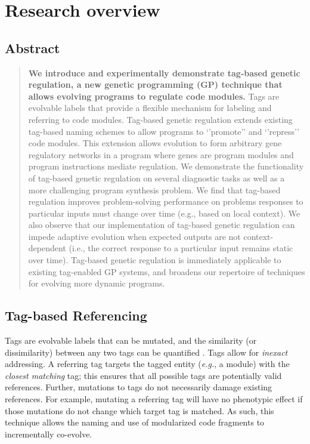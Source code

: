 \documentclass[]{book}
\begin{document}
\hypertarget{research-overview}{%
\section{Research overview}\label{research-overview}}

\hypertarget{abstract}{%
\subsection{Abstract}\label{abstract}}

\begin{quote}
\textbf{We introduce and experimentally demonstrate tag-based genetic regulation, a new genetic programming (GP) technique that allows evolving programs to regulate code modules.}
Tags are evolvable labels that provide a flexible mechanism for labeling and referring to code modules.
Tag-based genetic regulation extends existing tag-based naming schemes to allow programs to `'promote'' and `'repress'' code modules.
This extension allows evolution to form arbitrary gene regulatory networks in a program where genes are program modules and program instructions mediate regulation.
We demonstrate the functionality of tag-based genetic regulation on several diagnostic tasks as well as a more challenging program synthesis problem.
We find that tag-based regulation improves problem-solving performance on problems responses to particular inputs must change over time (e.g., based on local context).
We also observe that our implementation of tag-based genetic regulation can impede adaptive evolution when expected outputs are not context-dependent (i.e., the correct response to a particular input remains static over time).
Tag-based genetic regulation is immediately applicable to existing tag-enabled GP systems, and broadens our repertoire of techniques for evolving more dynamic programs.
\end{quote}

\hypertarget{tag-based-referencing}{%
\subsection{Tag-based Referencing}\label{tag-based-referencing}}

Tags are evolvable labels that can be mutated, and the similarity (or dissimilarity) between any two tags can be quantified \citep{spector_tag-based_2011}.
Tags allow for \emph{inexact} addressing.
A referring tag targets the tagged entity (\emph{e.g.}, a module) with the \emph{closest matching} tag;
this ensures that all possible tags are potentially valid references.
Further, mutations to tags do not necessarily damage existing references.
For example, mutating a referring tag will have no phenotypic effect if those mutations do not change which target tag is matched.
As such, this technique allows the naming and use of modularized code fragments to incrementally co-evolve.
\end{document}
